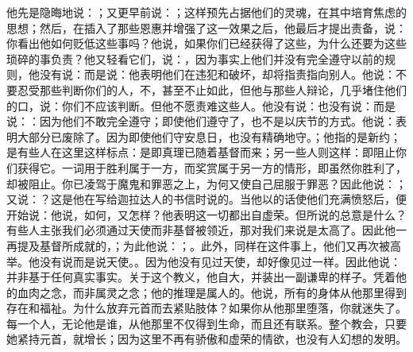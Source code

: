 他先是隐晦地说：；又更早前说：；这样预先占据他们的灵魂，在其中培育焦虑的思想；然后，在插入了那些恩惠并增强了这一效果之后，他最后才提出责备，说：你看出他如何贬低这些事吗？他说，如果你们已经获得了这些，为什么还要为这些琐碎的事负责？他又轻看它们，说：，因为事实上他们并没有完全遵守以前的规则，他没有说：而是说：他表明他们在违犯和破坏，却将指责指向别人。他说：不要忍受那些判断你们的人，不，甚至不止如此，但他与那些人辩论，几乎堵住他们的口，说：你们不应该判断。但他不愿责难这些人。他没有说：也没有说：而是说：：因为他们不敢完全遵守；即使他们遵守了，也不是以庆节的方式。他说：表明大部分已废除了。因为即使他们守安息日，也没有精确地守。；他指的是新约；是有些人在这里这样标点：是即真理已随着基督而来；另一些人则这样：即阻止你们获得它。\newline{}一词用于胜利属于一方，而奖赏属于另一方的情形，即虽然你胜利了，却被阻止。你已凌驾于魔鬼和罪恶之上，为何又使自己屈服于罪恶？因此他说：；又说：？这是他在写给迦拉达人的书信时说的。当他以的话使他们充满愤怒后，便开始说：他说，如何，又怎样？他表明这一切都出自虚荣。但所说的总意是什么？有些人主张我们必须通过天使而非基督被领近，那对我们来说是太高了。因此他一再提及基督所成就的，；为此他说：；。此外，同样在这件事上，他们又再次被高举。他没有说而是说天使。。因为他没有见过天使，却好像见过一样。因此他说：并非基于任何真实事实。关于这个教义，他自大，并装出一副谦卑的样子。凭着他的血肉之念，而非属灵之念；他的推理是属人的。他说，所有的身体从他那里得到存在和福祉。为什么放弃元首而去紧贴肢体？如果你从他那里堕落，你就迷失了。每一个人，无论他是谁，从他那里不仅得到生命，而且还有联系。整个教会，只要她紧持元首，就增长；因为这里不再有骄傲和虚荣的情欲，也没有人幻想的发明。\par

